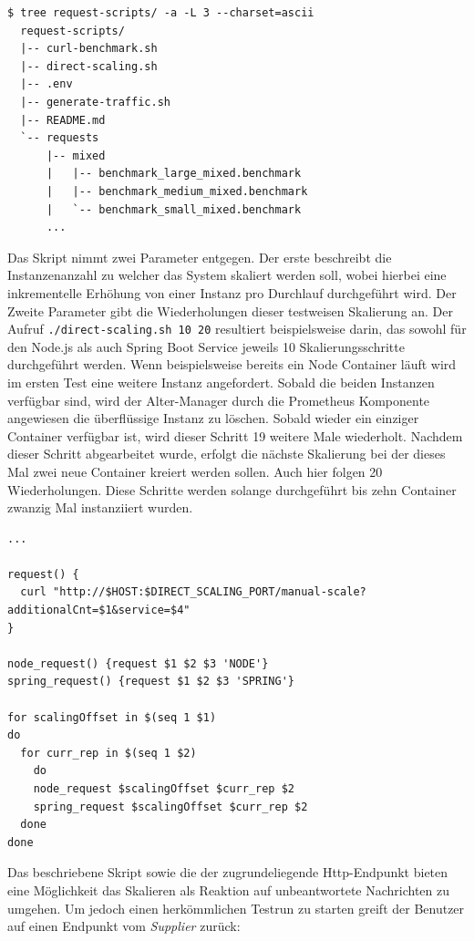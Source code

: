 \label{verb:scriptStruct}
\begin{lstlisting}[caption={request-script-structure},style=bashStyle]
  $ tree request-scripts/ -a -L 3 --charset=ascii
  request-scripts/
  |-- curl-benchmark.sh
  |-- direct-scaling.sh
  |-- .env
  |-- generate-traffic.sh
  |-- README.md
  `-- requests
      |-- mixed
      |   |-- benchmark_large_mixed.benchmark
      |   |-- benchmark_medium_mixed.benchmark
      |   `-- benchmark_small_mixed.benchmark
      ...
\end{lstlisting}

Das Skript nimmt zwei Parameter entgegen. Der erste beschreibt die Instanzenanzahl zu welcher das System skaliert werden soll, wobei hierbei eine inkrementelle Erhöhung von einer Instanz pro Durchlauf durchgeführt wird. Der Zweite Parameter gibt die Wiederholungen dieser testweisen Skalierung an. Der Aufruf \verb+./direct-scaling.sh 10 20+ resultiert beispielsweise darin, das sowohl für den Node.js als auch Spring Boot Service jeweils 10 Skalierungsschritte durchgeführt werden. Wenn beispielsweise bereits ein Node Container läuft wird im ersten Test eine weitere Instanz angefordert. Sobald die beiden Instanzen verfügbar sind, wird der Alter-Manager durch die Prometheus Komponente angewiesen die überflüssige Instanz zu löschen. Sobald wieder ein einziger Container verfügbar ist, wird dieser Schritt 19 weitere Male wiederholt. Nachdem dieser Schritt abgearbeitet wurde, erfolgt die nächste Skalierung bei der dieses Mal zwei neue Container kreiert werden sollen. Auch hier folgen 20 Wiederholungen. Diese Schritte werden solange durchgeführt bis zehn Container zwanzig Mal instanziiert wurden. 

\label{lst:direct-scaling}
\begin{lstlisting}[caption={direct-scaling},style=bashStyle]
...

request() {
  curl "http://$HOST:$DIRECT_SCALING_PORT/manual-scale?additionalCnt=$1&service=$4"
}

node_request() {request $1 $2 $3 'NODE'}
spring_request() {request $1 $2 $3 'SPRING'}

for scalingOffset in $(seq 1 $1)
do 
  for curr_rep in $(seq 1 $2)
	do 
    node_request $scalingOffset $curr_rep $2
    spring_request $scalingOffset $curr_rep $2
  done
done
\end{lstlisting}

Das beschriebene Skript sowie die der zugrundeliegende Http-Endpunkt bieten eine Möglichkeit das Skalieren als Reaktion auf unbeantwortete Nachrichten zu umgehen. Um jedoch einen herkömmlichen Testrun zu starten greift der Benutzer auf einen Endpunkt vom \emph{Supplier} zurück: 

